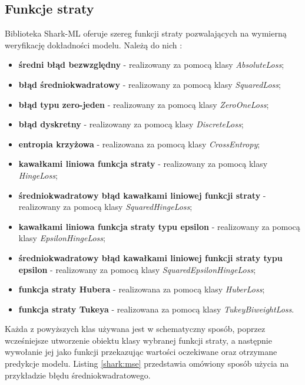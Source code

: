 \subsection{Funkcje straty}

Biblioteka Shark-ML oferuje szereg funkcji straty pozwalających na wymierną weryfikację dokładności modelu. Należą do nich \cite{shark:loss}:

\begin{itemize}
	\item \textbf{średni błąd bezwzględny} - realizowany za pomocą klasy \textit{AbsoluteLoss};
	\item \textbf{błąd średniokwadratowy} - realizowany za pomocą klasy \textit{SquaredLoss};
	\item \textbf{błąd typu zero-jeden} - realizowany za pomocą klasy \textit{ZeroOneLoss};
	\item \textbf{błąd dyskretny} - realizowany za pomocą klasy \textit{DiscreteLoss};
	\item \textbf{entropia krzyżowa} - realizowana za pomocą klasy \textit{CrossEntropy};
	\item \textbf{kawałkami liniowa funkcja straty} - realizowany za pomocą klasy \textit{HingeLoss};
	\item \textbf{średniokwadratowy błąd kawałkami liniowej funkcji straty} - realizowany za pomocą klasy \textit{SquaredHingeLoss};
	\item \textbf{kawałkami liniowa funkcja straty typu epsilon} - realizowany za pomocą klasy \textit{EpsilonHingeLoss};
	\item \textbf{średniokwadratowy błąd kawałkami liniowej funkcji straty typu epsilon} - realizowany za pomocą klasy \textit{SquaredEpsilonHingeLoss};
	\item \textbf{funkcja straty Hubera} - realizowana za pomocą klasy \textit{HuberLoss};
	\item \textbf{funkcja straty Tukeya} - realizowana za pomocą klasy \textit{TukeyBiweightLoss}.
\end{itemize}

Każda z powyższych klas używana jest w schematyczny sposób, poprzez wcześniejsze utworzenie obiektu klasy wybranej funkcji straty, a następnie wywołanie jej jako funkcji przekazując wartości oczekiwane oraz otrzymane predykcje modelu. Listing \ref{shark:mse} przedstawia omówiony sposób użycia na przykładzie błędu średniokwadratowego.


